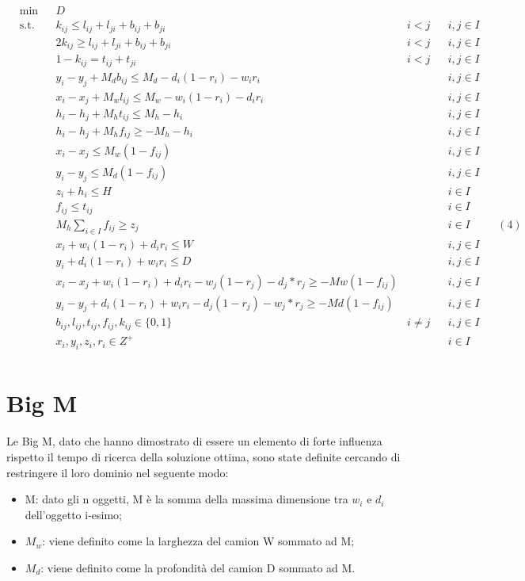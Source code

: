 \begin{equation*}
    \begin{aligned}
    & \underset{}{\text{min}}
    & & D \\
    & \text{s.t.} & & k_{ij} \leq l_{ij} + l_{ji} + b_{ij} + b_{ji} & i < j && i,j \in I \\
    & & & 2 k_{ij} \geq l_{ij} + l_{ji} + b_{ij} + b_{ji} & i < j && i,j \in I \\
    & & & 1 - k_{ij} = t_{ij} + t_{ji} & i < j && i,j \in I \\
    & & & y_i - y_j + M_d b_{ij} \leq M_d - d_i (1 - r_i) - w_i r_i & & & i,j \in I \\
    & & & x_i - x_j + M_w l_{ij} \leq M_w - w_i (1 - r_i) - d_i r_i & & & i,j \in I \\
    & & & h_i - h_j + M_h t_{ij} \leq M_h - h_i & & & i,j \in I \\
    & & & h_i - h_j + M_h f_{ij} \geq - M_h - h_i & & & i,j \in I \\
    & & & x_i - x_j \leq M_w (1-f_{ij}) & & & i,j \in I \\
    & & & y_i - y_j \leq M_d (1-f_{ij}) & & & i,j \in I \\
    & & & z_i + h_i \leq H & & & i \in I \\
    & & & f_{ij} \leq t_{ij} & & & i \in I \\
    & & & M_h \sum_{i \in I} f_{ij} \geq z_j  & & & i \in I & & (4) \\
    & & & x_i + w_i (1 - r_i) + d_i r_i \leq W & & & i,j \in I \\
    & & & y_i + d_i (1 - r_i) + w_i r_i \leq D & & & i,j \in I \\
    & & & x_i - x_j + w_i(1-r_i) + d_i r_i - w_j(1-r_j) - d_j*r_j \geq - Mw(1 - f_{ij}) & & & i,j \in I\\
    & & & y_i - y_j + d_i(1-r_i) + w_i r_i - d_j(1-r_j) - w_j*r_j \geq - Md(1 - f_{ij}) & & & i,j \in I\\
    & & & b_{ij}, l_{ij}, t_{ij}, f_{ij}, k_{ij} \in \{0,1\} & i \neq j & & i,j \in I \\
    & & & x_{i}, y_{i}, z_{i}, r_{i} \in Z^{+} & & & i \in I \\
    \end{aligned}
\end{equation*}

\section{Big M}
Le Big M, dato che hanno dimostrato di essere un elemento di forte influenza rispetto il tempo di ricerca della soluzione ottima, sono state definite cercando di restringere il loro dominio nel seguente modo:
\begin{itemize}
    \item M: dato gli n oggetti, M è la somma della massima dimensione tra $w_i$ e $d_i$ dell'oggetto i-esimo;
    \item $M_w$: viene definito come la larghezza del camion W sommato ad M;
    \item $M_d$: viene definito come la profondità del camion D sommato ad M.
\end{itemize}
